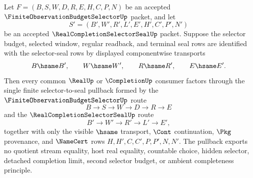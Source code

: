 \begin{theorem}
\label{thm:finite-observation-budget-selector-realcompletionselectorseal-pullback}
Let $F=(B,S,W,D,R,E,H,C,P,N)$ be an accepted $\FiniteObservationBudgetSelectorUp$ packet, and let
$$
S'=(B',W',R',L',E',H',C',P',N')
$$
be an accepted $\RealCompletionSelectorSealUp$ packet. Suppose the selector budget, selected window, regular readback, and terminal seal rows are identified with the selector-seal rows by displayed componentwise transports
$$
B \hsame B',\qquad
W \hsame W',\qquad
R \hsame R',\qquad
E \hsame E'.
$$
Then every common $\RealUp$ or $\CompletionUp$ consumer factors through the single finite selector-to-seal pullback formed by the $\FiniteObservationBudgetSelectorUp$ route
$$
B \to S \to W \to D \to R \to E
$$
and the $\RealCompletionSelectorSealUp$ route
$$
B' \to W' \to R' \to L' \to E',
$$
together with only the visible $\hsame$ transport, $\Cont$ continuation, $\Pkg$ provenance, and $\NameCert$ rows $H,H',C,C',P,P',N,N'$. The pullback exports no quotient stream equality, host real equality, countable choice, hidden selector, detached completion limit, second selector budget, or ambient completeness principle.
\end{theorem}
